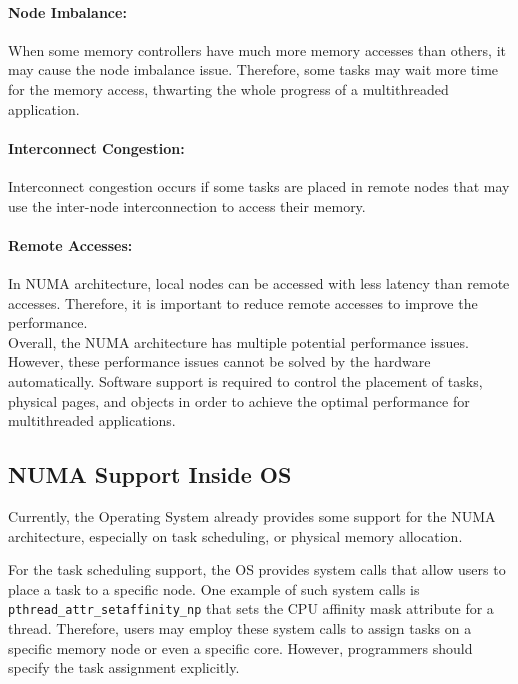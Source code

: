 \paragraph{Node Imbalance:} When some memory controllers have much more memory accesses than others, it may cause the node imbalance issue. Therefore, some tasks may wait more time for the memory access, thwarting the whole progress of a multithreaded application.  

\paragraph{Interconnect Congestion:} Interconnect congestion occurs if some tasks are placed in remote nodes that may use the inter-node interconnection to access their memory. 

\paragraph{Remote Accesses:} In NUMA architecture, local nodes can be accessed with less latency than remote accesses. Therefore, it is important to reduce remote accesses to improve the performance.\\


Overall, the NUMA architecture has multiple potential performance issues. However, these performance issues cannot be solved by the hardware automatically. Software support is required to control the placement of tasks, physical pages, and objects in order to achieve the optimal performance for multithreaded applications.  

\subsection{NUMA Support Inside OS}

Currently, the Operating System already provides some support for the NUMA architecture, especially on task scheduling, or physical memory allocation. 

For the task scheduling support, the OS provides  system calls that allow users to place a task to a specific node. One example of such system calls is \texttt{pthread\_attr\_setaffinity\_np} that   sets the CPU affinity mask attribute  for a thread. Therefore, users may employ these system calls to assign tasks on a specific memory node or even a specific core. However, programmers should specify the task assignment explicitly. 

